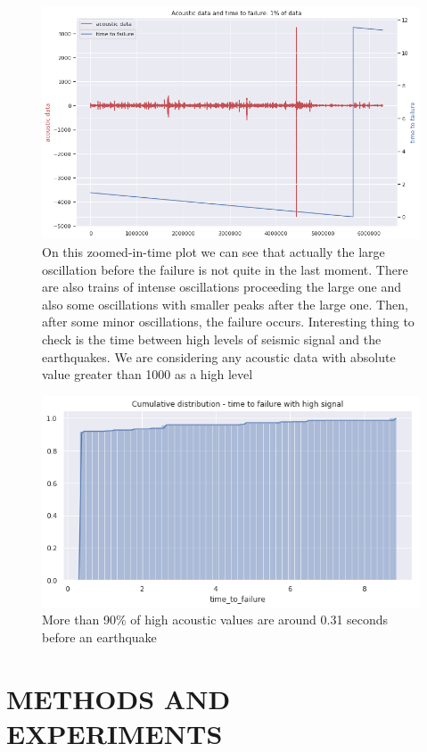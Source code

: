 \documentclass[]{llncs}
\begin{document}
\begin{figure}
	\centering
	\includegraphics[width=0.7\linewidth]{../GPUProject/zoomedInTimePlot}
	\caption{On this zoomed-in-time plot we can see that actually the large oscillation before the failure is not quite in the last moment. There are also trains of intense oscillations proceeding the large one and also some oscillations with smaller peaks after the large one. Then, after some minor oscillations, the failure occurs. Interesting thing to check is the time between high levels of seismic signal and the earthquakes. We are considering any acoustic data with absolute value greater than 1000 as a high level}
	\label{fig:zoomedintimeplot}
\end{figure}

\begin{figure}
	\centering
	\includegraphics[width=0.7\linewidth]{../GPUProject/moreThan90percent}
	\caption{More than 90\% of high acoustic values are around 0.31 seconds before an earthquake}
		\label{fig:morethan90percent}
	\end{figure}

\section{METHODS AND EXPERIMENTS}
\end{document}
